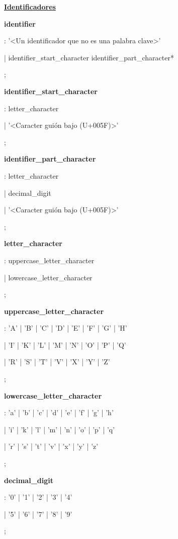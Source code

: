 \documentclass[12pt, letterpaper,spanish]{article}
\theoremstyle{definition}
\theoremstyle{remark}
\begin{document}
	\underline{\textbf{Identificadores}}\par
	\textbf{identifier}\par
	: '<Un identificador que no es una palabra clave>'\par
	| identifier\_start\_character identifier\_part\_character*\par
	;\par
	
	\textbf{identifier\_start\_character}\par
	: letter\_character\par
	| '<Caracter guión bajo (U+005F)>'\par
	;\par
	
	\textbf{identifier\_part\_character}\par
	: letter\_character\par
	| decimal\_digit\par
	| '<Caracter guión bajo (U+005F)>'\par
	;\par
	
	\textbf{letter\_character}\par
	: uppercase\_letter\_character\par
	| lowercase\_letter\_character\par
	;\par
	
	\textbf{uppercase\_letter\_character}\par
	: 'A' | 'B' | 'C' | 'D' | 'E' | 'F' | 'G' | 'H'\par 
	| 'I' | 'K' | 'L' | 'M' | 'N' | 'O' | 'P' | 'Q'\par 
	| 'R' | 'S' | 'T' | 'V' | 'X' | 'Y' | 'Z'\par    
	;\par
	
	\textbf{lowercase\_letter\_character}\par
	: 'a' | 'b' | 'c' | 'd' | 'e' | 'f' | 'g' | 'h'\par 
	| 'i' | 'k' | 'l' | 'm' | 'n' | 'o' | 'p' | 'q'\par
	| 'r' | 's' | 't' | 'v' | 'x' | 'y' | 'z'\par
	;\par
	
	\textbf{decimal\_digit}\par
	: '0' | '1' | '2' | '3' | '4'\par 
	| '5' | '6' | '7' | '8' | '9'\par
	;\par
	
\end{document}
